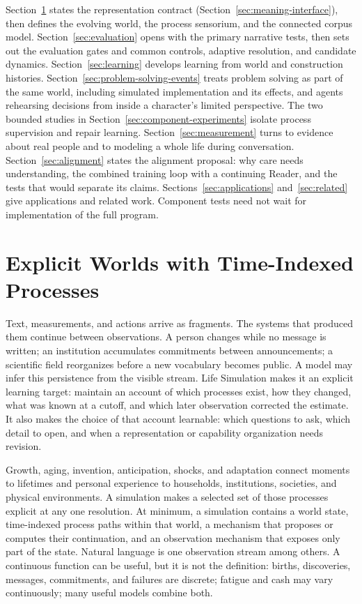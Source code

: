 \documentclass[10pt]{article}
\begin{document}
Section~\ref{sec:temporal-object} states the representation contract
(Section~\ref{sec:meaning-interface}), then defines the evolving world, the
process sensorium, and the connected corpus model. Section~\ref{sec:evaluation}
opens with the primary narrative tests, then sets out the evaluation gates and
common controls, adaptive resolution, and candidate dynamics. Section~\ref{sec:learning} develops learning from world and construction
histories. Section~\ref{sec:problem-solving-events} treats problem solving as
part of the same world, including simulated implementation and its effects,
and agents rehearsing decisions from inside a character's limited perspective.
The two bounded studies in Section~\ref{sec:component-experiments} isolate
process supervision and repair learning. Section~\ref{sec:measurement} turns to evidence about real people and to modeling
a whole life during conversation. Section~\ref{sec:alignment} states the alignment
proposal: why care needs understanding, the combined training loop with a continuing
Reader, and the tests that would separate its claims. Sections~\ref{sec:applications}
and~\ref{sec:related} give applications and related work. Component tests need
not wait for implementation of the full program.

\section{Explicit Worlds with Time-Indexed Processes}
\label{sec:temporal-object}

Text, measurements, and actions arrive as fragments. The systems that produced
them continue between observations. A person changes while no message is
written; an institution accumulates commitments between announcements; a
scientific field reorganizes before a new vocabulary becomes public. A model
may infer this persistence from the visible stream. Life Simulation makes it
an explicit learning target: maintain an account of which processes exist,
how they changed, what was known at a cutoff, and which later observation
corrected the estimate. It also makes the choice of that account learnable:
which questions to ask, which detail to open, and when a representation or
capability organization needs revision.

Growth, aging, invention,
anticipation, shocks, and adaptation connect moments to lifetimes and personal
experience to households, institutions, societies, and physical environments.
A simulation makes a selected set of those processes explicit at any one
resolution. At minimum,
a simulation contains a world state, time-indexed process paths within that
world, a mechanism that proposes or computes their continuation, and an
observation mechanism that exposes only part of the state. Natural language is
one observation stream among others. A continuous function can be useful, but
it is not the definition: births, discoveries, messages, commitments, and
failures are discrete; fatigue and cash may vary continuously; many useful
models combine both.
\end{document}
